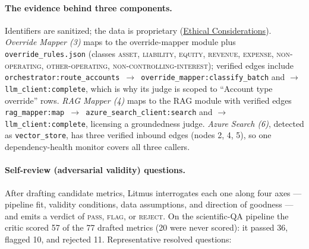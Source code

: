 \documentclass[11pt]{article}
\begin{document}
\paragraph{The evidence behind three components.}
Identifiers are sanitized; the data is proprietary (\hyperref[sec:ethics]{Ethical Considerations}). \emph{Override Mapper (3)} maps to the override-mapper module plus \texttt{override\_rules.json} (classes \textsc{asset, liability, equity, revenue, expense, non-operating, other-operating, non-controlling-interest}); verified edges include \texttt{orchestrator:route\_accounts $\to$ override\_mapper:classify\_batch} and \texttt{$\to$ llm\_client:complete}, which is why its judge is scoped to ``Account type override'' rows. \emph{RAG Mapper (4)} maps to the RAG module with verified edges \texttt{rag\_mapper:map $\to$ azure\_search\_client:search} and \texttt{$\to$ llm\_client:complete}, licensing a groundedness judge. \emph{Azure Search (6)}, detected as \texttt{vector\_store}, has three verified inbound edges (nodes 2, 4, 5), so one dependency-health monitor covers all three callers.

\paragraph{Self-review (adversarial validity) questions.} After drafting candidate metrics, Litmus interrogates each one along four axes ---pipeline fit, validity conditions, data assumptions, and direction of goodness ---and emits a verdict of \textsc{pass}, \textsc{flag}, or \textsc{reject}. On the scientific-QA pipeline the critic scored 57 of the 77 drafted metrics (20 were never scored): it passed 36, flagged 10, and rejected 11. Representative resolved questions:
\end{document}
